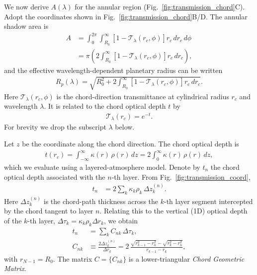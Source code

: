 We now derive $A(\lambda)$ for the annular region (Fig.~\ref{fig:transmission_chord}C).
Adopt the coordinates shown in Fig.~\ref{fig:transmission_chord}B/D.
The annular shadow area is
\begin{align}
A &= \int_0^{2 \pi} \int_{R_0}^\infty \!\!\left[ 1 - \mathcal{T}_\lambda(r_c, \phi)\right] r_c \, d r_c \, d\phi \nonumber \\
&= \pi \left( 2 \int_{R_0}^\infty \left[ 1 - \mathcal{T}_\lambda(r_c, \phi)\right] r_c \, d r_c \right),
\end{align}
and the effective wavelength-dependent planetary radius can be written
\begin{align}
    \label{eq:rp_trans}
    R_p(\lambda) = \sqrt{ R_0^2 + 2 \int_{R_0}^\infty \!\!\left[ 1 - \mathcal{T}_\lambda(r_c, \phi)\right] r_c \, d r_c } .
\end{align}
Here $\mathcal{T}_\lambda(r_c,\phi)$ is the chord-direction transmittance at cylindrical radius $r_c$ and wavelength $\lambda$. It is related to the chord optical depth $t$ by
\begin{align}
  \mathcal{T}_\lambda(r_c) = e^{-t}.
\end{align}
For brevity we drop the subscript $\lambda$ below.

Let $z$ be the coordinate along the chord direction. The chord optical depth is
\begin{align}
    t(r_c) = \int_{-\infty}^\infty \kappa(r)\, \rho(r)\, dz
           = 2 \int_{0}^\infty \kappa(r)\, \rho(r)\, dz ,
\end{align}
which we evaluate using a layered-atmosphere model. Denote by $t_n$ the chord optical depth associated with the $n$-th layer. From Fig.~\ref{fig:transmission_coord},
\begin{align}
    t_n &= 2 \sum_k \kappa_k \rho_k \, \Delta z^{(n)}_k .
\end{align}
Here $\Delta z^{(n)}_k$ is the chord-path thickness across the $k$-th layer segment intercepted by the chord tangent to layer $n$. Relating this to the vertical (1D) optical depth of the $k$-th layer, $\Delta \tau_k = \kappa_k \rho_k \Delta r_k$, we obtain
\begin{align}
    t_n &= \sum_k  C_{nk} \, \Delta \tau_k ,\\
    \label{eq:chord_geo_matrix}
    C_{nk} &\equiv \frac{2 \Delta z^{(n)}_k}{\Delta r_k}
    = 2 \,\frac{\sqrt{r_{k-1}^2 - r_{n}^2} - \sqrt{r_{k}^2 - r_{n}^2}}{r_{k-1} - r_{k}} ,
\end{align}
with $r_{N-1}=R_0$. The matrix $C=\{C_{nk}\}$ is a lower-triangular \emph{Chord Geometric Matrix}.

